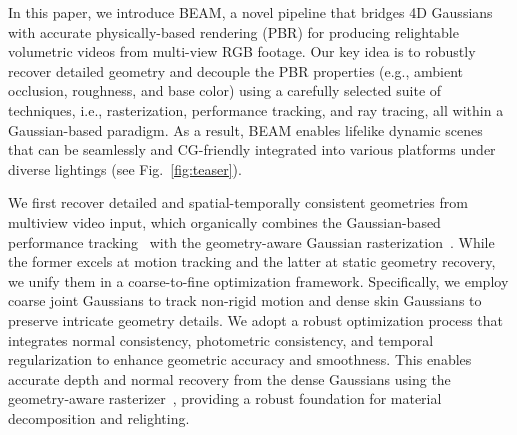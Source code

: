 In this paper, we introduce BEAM, a novel pipeline that bridges 4D Gaussians with accurate physically-based rendering (PBR) for producing relightable volumetric videos from multi-view RGB footage. Our key idea is to robustly recover detailed geometry and decouple the PBR properties (e.g., ambient occlusion, roughness, and base color) using a carefully selected suite of techniques, i.e., rasterization, performance tracking, and ray tracing, all within a Gaussian-based paradigm. As a result, BEAM enables lifelike dynamic scenes that can be seamlessly and CG-friendly integrated into various platforms under diverse lightings (see Fig.~\ref{fig:teaser}). 

We first recover detailed and spatial-temporally consistent geometries from multiview video input, which organically combines the Gaussian-based performance tracking~\cite{jiang2024robust} with the geometry-aware Gaussian rasterization~\cite{zhang2024rade}. While the former excels at motion tracking and the latter at static geometry recovery, we unify them in a coarse-to-fine optimization framework. Specifically, we employ coarse joint Gaussians to track non-rigid motion and dense skin Gaussians to preserve intricate geometry details. We adopt a robust optimization process that integrates normal consistency, photometric consistency, and temporal regularization to enhance geometric accuracy and smoothness. This enables accurate depth and normal recovery from the dense Gaussians using the geometry-aware rasterizer~\cite{zhang2024rade}, providing a robust foundation for material decomposition and relighting.

